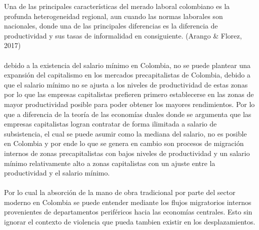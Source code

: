 \documentclass[12pt,letterpaper]{article}
\begin{document}
\begin{flushleft}


Una de las principales características del merado laboral colombiano es la profunda heterogeneidad regional, aun cuando las normas laborales son nacionales, 
donde una de las principales diferencias es la diferencia de productividad y sus tasas de informalidad en consiguiente. (Arango \& Florez, 2017)\\
~\\

debido a la existencia del salario mínimo en Colombia, no se puede plantear una expansión del capitalismo en los mercados precapitalistas de Colombia,
debido a que el salario mínimo no se ajusta a los niveles de productividad de estas zonas por lo que las empresas capitalistas prefieren primero establecerse en 
las zonas de mayor productividad posible para poder obtener los mayores rendimientos. Por lo que a diferencia de la teoría de las economías duales donde 
se argumenta que las empresas capitalistas logran contratar de forma ilimitada a salario de subsistencia, el cual se puede asumir como la mediana del salario, no es posible en Colombia 
y por ende lo que se genera en cambio son procesos de migración internos de zonas precapitalistas con bajos niveles de productividad y un salario mínimo relativamente alto a zonas capitalistas con un ajuste entre la productividad y el salario mínimo.\\

~\\
Por lo cual la absorción de la mano de obra tradicional por parte del sector moderno en Colombia se puede entender mediante los flujos migratorios internos
provenientes de departamentos periféricos hacia las economías centrales. Esto sin ignorar el contexto de violencia que pueda tambien existir en los desplazamientos.\\
~\\

\newpage


\end{flushleft}
\end{document}
